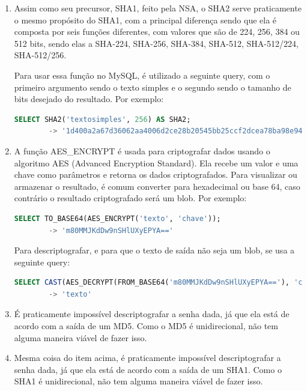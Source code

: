 \documentclass{article}
\begin{document}
\begin{enumerate}[label=\alph*)]
    \item Assim como seu precursor, SHA1, feito pela NSA, o SHA2 serve praticamente o mesmo propósito do SHA1, com a principal diferença sendo que ela é composta por seis funções diferentes, com valores que são de 224, 256, 384 ou 512 bits, sendo elas a SHA-224, SHA-256, SHA-384, SHA-512, SHA-512/224, SHA-512/256.
    \par Para usar essa função no MySQL, é utilizado a seguinte query, com o primeiro argumento sendo o texto simples e o segundo sendo o tamanho de bits desejado do resultado. Por exemplo:
    
    \begin{lstlisting}[language=SQL]
        SELECT SHA2('textosimples', 256) AS SHA2;
        -> '1d400a2a67d36062aa4006d2ce28b20545bb25ccf2dcea78ba98e94389de7dfb'
    \end{lstlisting}

    \item A função AES\_ENCRYPT é usada para criptografar dados usando o algoritmo AES (Advanced Encryption Standard). Ela recebe um valor e uma chave como parâmetros e retorna os dados criptografados. Para visualizar ou armazenar o resultado, é comum converter para hexadecimal ou base 64, caso contrário o resultado criptografado será um blob. Por exemplo:

    \begin{lstlisting}[language=SQL]
        SELECT TO_BASE64(AES_ENCRYPT('texto', 'chave'));
        -> 'm80MMJKdDw9nSHlUXyEPYA=='
    \end{lstlisting}

    \par Para descriptografar, e para que o texto de saída não seja um blob, se usa a seguinte query:

    \begin{lstlisting}[language=SQL]
        SELECT CAST(AES_DECRYPT(FROM_BASE64('m80MMJKdDw9nSHlUXyEPYA=='), 'chave') AS CHAR);
        -> 'texto'
    \end{lstlisting}

    \item É praticamente impossível descriptografar a senha dada, já que ela está de acordo com a saída de um MD5. Como o MD5 é unidirecional, não tem alguma maneira viável de fazer isso.
    
    \item Mesma coisa do item acima, é praticamente impossível descriptografar a senha dada, já que ela está de acordo com a saída de um SHA1. Como o SHA1 é unidirecional, não tem alguma maneira viável de fazer isso.
    

\end{enumerate}
\end{document}
